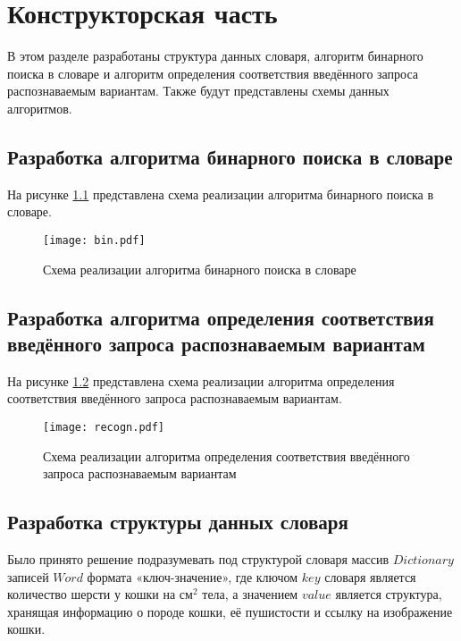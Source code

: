 \chapter{Конструкторская часть}

В этом разделе разработаны структура данных словаря, алгоритм бинарного поиска в словаре и алгоритм определения соответствия введённого запроса распознаваемым вариантам. Также будут представлены схемы данных алгоритмов.

\section{Разработка алгоритма бинарного поиска в словаре}
На рисунке \ref{img:bin} представлена схема реализации алгоритма бинарного поиска в словаре. 

\begin{figure}[h!]
    \centering
    \texttt{[image: bin.pdf]}
    \caption{Схема реализации алгоритма бинарного поиска в словаре}
    \label{img:bin}
\end{figure}

\section{Разработка алгоритма определения соответствия введённого запроса распознаваемым вариантам}
На рисунке \ref{img:recogn} представлена схема реализации алгоритма определения соответствия введённого запроса распознаваемым вариантам.

\begin{figure}[h!]
    \centering
    \texttt{[image: recogn.pdf]}
    \caption{Схема реализации алгоритма определения соответствия введённого запроса распознаваемым вариантам}
    \label{img:recogn}
\end{figure}

\section{Разработка структуры данных словаря}
Было принято решение подразумевать под структурой словаря массив $Dictionary$ записей $Word$ формата «ключ-значение», где ключом $key$ словаря является количество шерсти у кошки на см$^2$ тела, а значением $value$ является структура, хранящая информацию о породе кошки, её пушистости и ссылку на изображение кошки.

\newpage